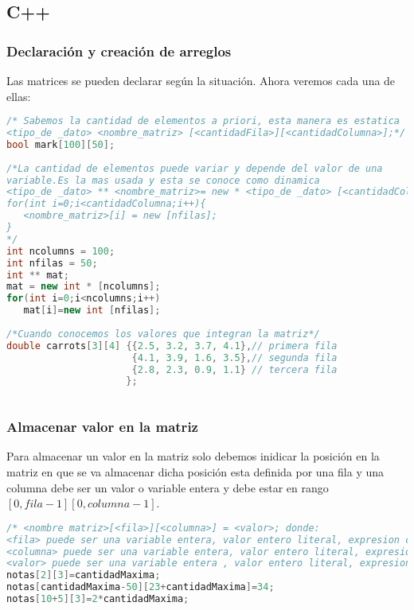 \subsection{C++}

\subsubsection{Declaración y creación de arreglos}
Las matrices se pueden declarar según la situación. Ahora veremos cada una de ellas:

\begin{lstlisting}[language=C++]
/* Sabemos la cantidad de elementos a priori, esta manera es estatica 
<tipo_de _dato> <nombre_matriz> [<cantidadFila>][<cantidadColumna>];*/
bool mark[100][50];
	
/*La cantidad de elementos puede variar y depende del valor de una 
variable.Es la mas usada y esta se conoce como dinamica
<tipo_de _dato> ** <nombre_matriz>= new * <tipo_de _dato> [<cantidadColumna>];
for(int i=0;i<cantidadColumna;i++){
   <nombre_matriz>[i] = new [nfilas]; 
}
*/
int ncolumns = 100;
int nfilas = 50;
int ** mat;
mat = new int * [ncolumns];
for(int i=0;i<ncolumns;i++)
   mat[i]=new int [nfilas];
	
/*Cuando conocemos los valores que integran la matriz*/
double carrots[3][4] {{2.5, 3.2, 3.7, 4.1},// primera fila
                      {4.1, 3.9, 1.6, 3.5},// segunda fila
                      {2.8, 2.3, 0.9, 1.1} // tercera fila
                     };
	
\end{lstlisting}

\subsubsection{Almacenar valor en la matriz}
Para almacenar un valor en la matriz solo debemos inidicar la posición en la matriz en que se va almacenar dicha posición esta definida por una fila y una columna debe ser un valor o variable entera y debe estar en rango $[0,fila-1][0,columna-1]$.

\begin{lstlisting}[language=C++]
/* <nombre matriz>[<fila>][<columna>] = <valor>; donde:
<fila> puede ser una variable entera, valor entero literal, expresion cuyo resultado sea entero e indicada la fila a la que quiero acceder en la matriz
<columna> puede ser una variable entera, valor entero literal, expresion cuyo resultado sea entero e indicada la columna a la que quiero acceder en la matriz 
<valor> puede ser una variable entera , valor entero literal, expresion cuyo resultado sea entero */
notas[2][3]=cantidadMaxima;
notas[cantidadMaxima-50][23+cantidadMaxima]=34;
notas[10+5][3]=2*cantidadMaxima;
\end{lstlisting}

